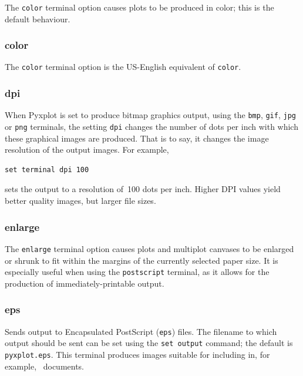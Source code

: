The {\tt color} terminal option causes plots to be produced in color; this is
the default behaviour.


\subsubsection{color}

The {\tt color} terminal option is the US-English equivalent of {\tt color}.


\subsubsection{dpi}

When Pyxplot is set to produce bitmap graphics output, using the {\tt bmp},
{\tt gif}, {\tt jpg} or {\tt png} terminals, the setting {\tt dpi} changes the
number of dots per inch with which these graphical images are produced. That is
to say, it changes the image resolution of the output images. For example,

\begin{verbatim}
set terminal dpi 100
\end{verbatim}

\noindent sets the output to a resolution of~100 dots per inch. Higher DPI
values yield better quality images, but larger file sizes.


\subsubsection{enlarge}

The {\tt enlarge} terminal option causes plots and multiplot canvases to be
enlarged or shrunk to fit within the margins of the currently selected paper
size. It is especially useful when using the {\tt postscript} terminal, as it
allows for the production of immediately-printable output.


\subsubsection{eps}

Sends output to Encapsulated PostScript ({\tt eps}) files.  The filename to
which output should be sent can be set using the {\tt set output} command; the
default is {\tt pyxplot.eps}.  This terminal produces images suitable for
including in, for example, \latexdcf\ documents.


